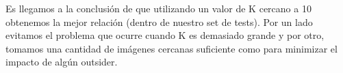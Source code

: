 
Es llegamos a la conclusión de que utilizando un valor de K cercano a 10 obtenemos la mejor relación (dentro de nuestro set de tests).
Por un lado evitamos el problema que ocurre cuando K es demasiado grande y por otro, tomamos una cantidad de imágenes cercanas suficiente como para minimizar el impacto de algún outsider.


